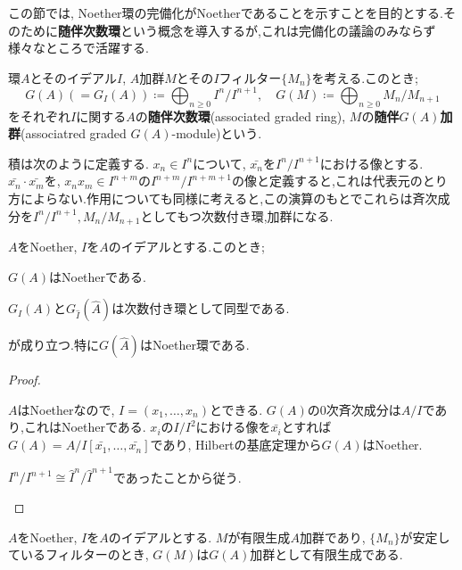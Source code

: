 この節では, Noether環の完備化がNoetherであることを示すことを目的とする.そのために\textbf{随伴次数環}という概念を導入するが,これは完備化の議論のみならず様々なところで活躍する.

\begin{defi}[随伴次数環]\label{defi:随伴次数環}
	環$A$とそのイデアル$I$, $A$加群$M$とその$I$フィルター$\{M_n\}$を考える.このとき;
	\[G(A)(=G_I(A))\coloneq\bigoplus_{n\geq0}I^n/I^{n+1},\quad G(M)\coloneq\bigoplus_{n\geq0}M_n/M_{n+1}\]
	をそれぞれ$I$に関する$A$の\textbf{随伴次数環}(associated graded ring), $M$の\textbf{随伴}$G(A)$\textbf{加群}(associatred graded $G(A)$-module)という.
\end{defi}

積は次のように定義する. $x_n\in I^n$について, $\bar{x_n}$を$I^n/I^{n+1}$における像とする. $\bar{x_n}\cdot\bar{x_m}$を, $x_nx_m\in I^{n+m}$の$I^{n+m}/I^{n+m+1}$の像と定義すると,これは代表元のとり方によらない.作用についても同様に考えると,この演算のもとでこれらは斉次成分を$I^n/I^{n+1},M_n/M_{n+1}$としてもつ次数付き環,加群になる.

\begin{prop}\label{prop:G(hat{A})はNoether}
	$A$をNoether, $I$を$A$のイデアルとする.このとき;
	\begin{sakura}
		\item $G(A)$はNoetherである.
		\item $G_I(A)$と$G_{\widehat{I}}(\widehat{A})$は次数付き環として同型である.
	\end{sakura}
	が成り立つ.特に$G(\widehat{A})$はNoether環である.
\end{prop}

\begin{proof}
	\begin{sakura}
		\item $A$はNoetherなので, $I=(x_1,\dots, x_n)$とできる. $G(A)$の$0$次斉次成分は$A/I$であり,これはNoetherである. $x_i$の$I/I^2$における像を$\bar{x_i}$とすれば$G(A)=A/I[\bar{x_1},\dots,\bar{x_n}]$であり, Hilbertの基底定理から$G(A)$はNoether.
		
		\item $I^n/I^{n+1}\cong\widehat{I}^n/\widehat{I}^{n+1}$であったことから従う.
	\end{sakura}
\end{proof}

\begin{prop}\label{prop:フィルターが安定していればG(M)は有限生成}
	$A$をNoether, $I$を$A$のイデアルとする. $M$が有限生成$A$加群であり, $\{M_n\}$が安定しているフィルターのとき, $G(M)$は$G(A)$加群として有限生成である.
\end{prop}

